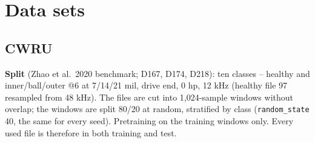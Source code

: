 
\chapter{Data sets}


\section{CWRU}
\textbf{Split} (Zhao et al.\ 2020 benchmark; D167, D174, D218): ten classes -- healthy and inner/ball/outer @6 at 7/14/21 mil, drive end, 0 hp, 12 kHz (healthy file 97 resampled from 48 kHz). The files are cut into 1,024-sample windows without overlap; the windows are split 80/20 at random, stratified by class (\texttt{random\_state} 40, the same for every seed). Pretraining on the training windows only. Every used file is therefore in both training and test.

